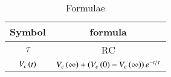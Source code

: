 \setlength{\arrayrulewidth}{0.3mm}
\setlength{\tabcolsep}{15pt}
\renewcommand{\arraystretch}{1.4}

\begin{table}[ht]
\centering

\begin{tabular}{|c|c|}
\hline

Symbol & formula\\
\hline
$\tau$ & RC\\
\hline
$V_c\left(t\right)$ & $V_c\left(\infty\right)+\left(V_c\left(0\right)-V_c\left(\infty\right)\right)e^{-t/ \tau}$\\
\hline

\end{tabular}
\vspace{0.25cm}
\caption{Formulae}
\label{tab:Gate.ee.54}



\end{table}